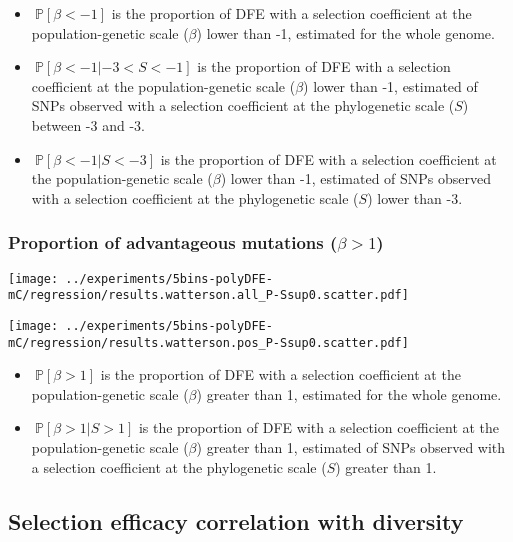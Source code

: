 \documentclass{article}
\newcommand{\proba}{\mathbb{P}}
\newcommand{\Sphy}{S}
\newcommand{\divStrongDel}{\Sphy < -3}
\newcommand{\divDel}{-3 < \Sphy < -1}
\newcommand{\divAdv}{ \Sphy > 1}
\newcommand{\Spop}{\beta}
\newcommand{\polyDel}{\Spop < -1}
\newcommand{\polyAdv}{ \Spop > 1}
\begin{document}
    \begin{itemize}
        \item $\ \proba [ \polyDel ]$ is the proportion of DFE with a selection coefficient at the population-genetic scale ($\Spop$) lower than -1, estimated for the whole genome.
        \item $\ \proba [ \polyDel | \divDel]$ is the proportion of DFE with a selection coefficient at the population-genetic scale ($\Spop$) lower than -1, estimated of SNPs observed with a selection coefficient at the phylogenetic scale ($\Sphy$) between -3 and -3.
        \item $\ \proba [ \polyDel | \divStrongDel ]$ is the proportion of DFE with a selection coefficient at the population-genetic scale ($\Spop$) lower than -1, estimated of SNPs observed with a selection coefficient at the phylogenetic scale ($\Sphy$) lower than -3.
    \end{itemize}

    \subsubsection{Proportion of advantageous mutations ($\polyAdv$)}

    \begin{minipage}{0.32\linewidth}
        \texttt{[image: ../experiments/5bins-polyDFE-mC/regression/results.watterson.all\_P-Ssup0.scatter.pdf]}
    \end{minipage}
    \begin{minipage}{0.32\linewidth}
        \texttt{[image: ../experiments/5bins-polyDFE-mC/regression/results.watterson.pos\_P-Ssup0.scatter.pdf]}
    \end{minipage}

    \begin{itemize}
        \item $\ \proba [ \polyAdv  ]$ is the proportion of DFE with a selection coefficient at the population-genetic scale ($\Spop$) greater than 1, estimated for the whole genome.
        \item $\ \proba [ \polyAdv | \divAdv] $ is the proportion of DFE with a selection coefficient at the population-genetic scale ($\Spop$) greater than 1, estimated of SNPs observed with a selection coefficient at the phylogenetic scale ($\Sphy$) greater than 1.
    \end{itemize}

    \subsection{Selection efficacy correlation with diversity}
\end{document}
